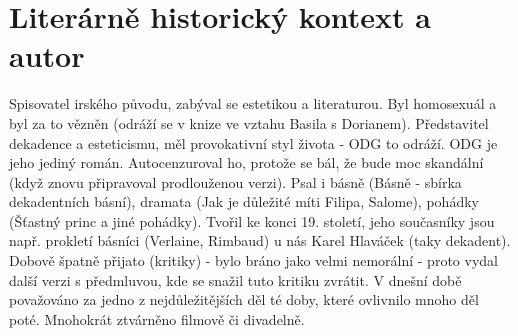 \documentclass[11pt]{article}
\begin{document}
    \section*{Literárně historický kontext a autor}
    Spisovatel irského původu, zabýval se estetikou a literaturou. Byl homosexuál a byl za to vězněn (odráží se v knize ve vztahu Basila s Dorianem).
    Představitel dekadence a esteticismu, měl provokativní styl života - ODG to odráží.
    ODG je jeho jediný román. Autocenzuroval ho, protože se bál, že bude moc skandální (když znovu připravoval prodlouženou verzi).
    Psal i básně (Básně - sbírka dekadentních básní), dramata (Jak je důležité míti Filipa, Salome), pohádky (Šťastný princ a jiné pohádky).
    Tvořil ke konci 19. století, jeho současníky jsou např. prokletí básníci (Verlaine, Rimbaud) u nás Karel Hlaváček (taky dekadent).
    Dobově špatně přijato (kritiky) - bylo bráno jako velmi nemorální - proto vydal další verzi s předmluvou, kde se snažil tuto kritiku zvrátit.
    V dnešní době považováno za jedno z nejdůležitějších děl té doby, které ovlivnilo mnoho děl poté.
    Mnohokrát ztvárněno filmově či divadelně.
\end{document}
